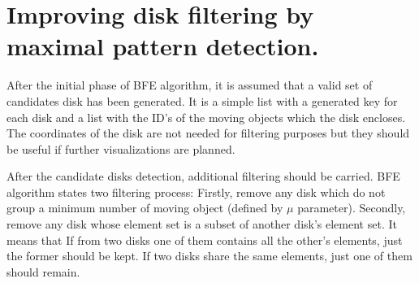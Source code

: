 \documentclass[10pt]{scrartcl}
\begin{document}
\section*{Improving disk filtering by maximal pattern detection.}
After the initial phase of BFE algorithm, it is assumed that a valid set of candidates disk has been generated.  It is a simple list with a generated key for each disk and a list with the ID's of the moving objects which the disk encloses. The coordinates of the disk are not needed for filtering purposes but they should be useful if further visualizations are planned.

After the candidate disks detection, additional filtering should be carried.  BFE algorithm states two filtering process: Firstly, remove any disk which do not group a minimum number of moving object (defined by $\mu$ parameter). Secondly, remove any disk whose element set is a subset of another disk's element set. It means that If from two disks one of them contains all the other's elements, just the former should be kept.  If two disks share the same elements, just one of them should remain.  
\end{document}
